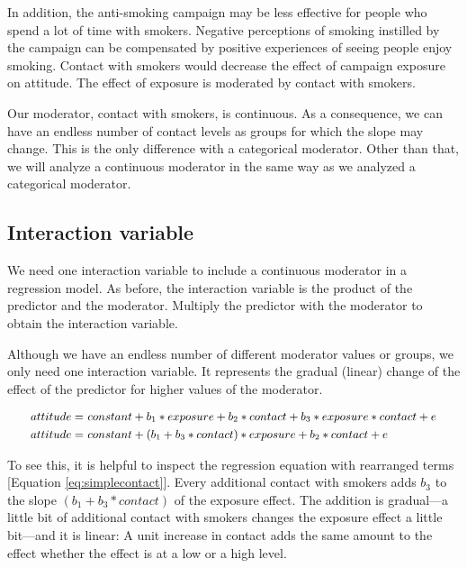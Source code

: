 \documentclass[a4paper]{book}
\theoremstyle{definition}
\theoremstyle{definition}
\theoremstyle{definition}
\theoremstyle{remark}
\begin{document}
In addition, the anti-smoking campaign may be less effective for people
who spend a lot of time with smokers. Negative perceptions of smoking
instilled by the campaign can be compensated by positive experiences of
seeing people enjoy smoking. Contact with smokers would decrease the
effect of campaign exposure on attitude. The effect of exposure is
moderated by contact with smokers.

Our moderator, contact with smokers, is continuous. As a consequence, we
can have an endless number of contact levels as groups for which the
slope may change. This is the only difference with a categorical
moderator. Other than that, we will analyze a continuous moderator in
the same way as we analyzed a categorical moderator.

\subsection{Interaction variable}\label{interpret-cont-interaction}

We need one interaction variable to include a continuous moderator in a
regression model. As before, the interaction variable is the product of
the predictor and the moderator. Multiply the predictor with the
moderator to obtain the interaction variable.

Although we have an endless number of different moderator values or
groups, we only need one interaction variable. It represents the gradual
(linear) change of the effect of the predictor for higher values of the
moderator.

\begin{equation}
\small
\begin{split}
  attitude = &\ constant + b_1*exposure + b_2*contact + b_3*exposure*contact + e \\
  attitude = &\ constant + (b_1 + b_3*contact)*exposure + b_2*contact + e 
\end{split}
\label{eq:simplecontact} 
\normalsize
\end{equation}

To see this, it is helpful to inspect the regression equation with
rearranged terms {[}Equation \eqref{eq:simplecontact}{]}. Every additional
contact with smokers adds \(b_3\) to the slope \((b_1 + b_3*contact)\)
of the exposure effect. The addition is gradual---a little bit of
additional contact with smokers changes the exposure effect a little
bit---and it is linear: A unit increase in contact adds the same amount
to the effect whether the effect is at a low or a high level.
\end{document}
